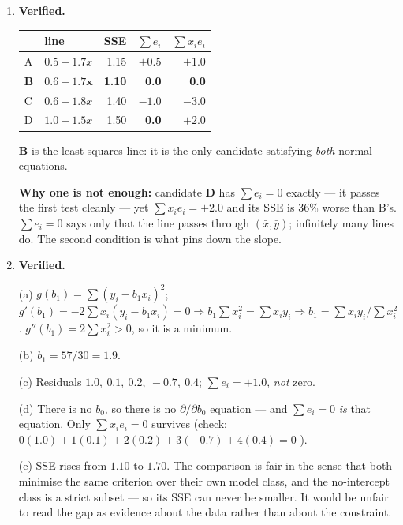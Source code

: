 \documentclass[11pt,a4paper]{article}
\newcommand{\A}[1]{\item[\textbf{#1}]}
\begin{document}
\begin{enumerate}[leftmargin=1.9cm]
\A{U5.47} \textbf{Verified.}
\begin{answerbox}
\begin{center}\begin{tabular}{@{}llrrr@{}}\toprule
& line & SSE & $\sum e_i$ & $\sum x_ie_i$\\
\midrule
A & $0.5 + 1.7x$ & 1.15 & $+0.5$ & $+1.0$\\
\textbf{B} & $\mathbf{0.6 + 1.7x}$ & \textbf{1.10} & \textbf{0.0} & \textbf{0.0}\\
C & $0.6 + 1.8x$ & 1.40 & $-1.0$ & $-3.0$\\
D & $1.0 + 1.5x$ & 1.50 & \textbf{0.0} & $+2.0$\\
\bottomrule\end{tabular}\end{center}
\textbf{B} is the least-squares line: it is the only candidate satisfying
\emph{both} normal equations.

\textbf{Why one is not enough:} candidate \textbf{D} has $\sum e_i = 0$ exactly
--- it passes the first test cleanly --- yet $\sum x_ie_i = +2.0$ and its SSE
is 36\% worse than B's. $\sum e_i = 0$ says only that the line passes through
$(\bar x,\bar y)$; infinitely many lines do. The second condition is what pins
down the slope.
\end{answerbox}

\A{U5.48} \textbf{Verified.}
\begin{answerbox}
(a) $g(b_1) = \sum(y_i - b_1x_i)^2$; $g'(b_1) = -2\sum x_i(y_i-b_1x_i) = 0
\Rightarrow b_1\sum x_i^2 = \sum x_iy_i \Rightarrow b_1 = \sum x_iy_i/\sum x_i^2$.
$g''(b_1) = 2\sum x_i^2 > 0$, so it is a minimum.

(b) $b_1 = 57/30 = \mathbf{1.9}$.

(c) Residuals $\mathbf{1.0,\ 0.1,\ 0.2,\ -0.7,\ 0.4}$;
$\sum e_i = \mathbf{+1.0}$, \emph{not} zero.

(d) There is no $b_0$, so there is no $\partial/\partial b_0$ equation --- and
$\sum e_i = 0$ \emph{is} that equation. Only $\sum x_ie_i = 0$ survives (check:
$0(1.0)+1(0.1)+2(0.2)+3(-0.7)+4(0.4) = 0$ \checkmark).

(e) SSE rises from $1.10$ to $\mathbf{1.70}$. The comparison is fair in the
sense that both minimise the same criterion over their own model class, and the
no-intercept class is a strict subset --- so its SSE can never be smaller. It
would be unfair to read the gap as evidence about the data rather than about
the constraint.
\end{answerbox}


\end{enumerate}
\end{document}
